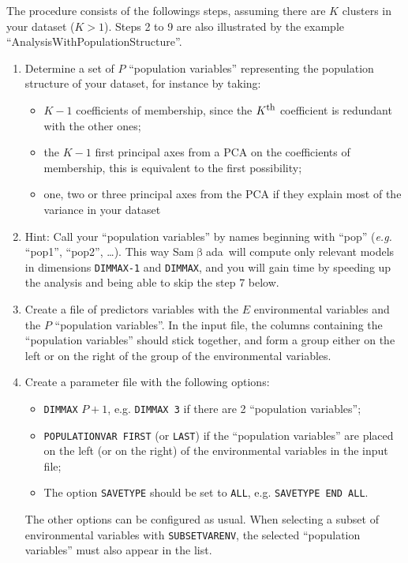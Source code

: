 \documentclass[a4paper,11pt]{article}
\newcommand{\smb}{\textsf{Sam$\upbeta$ada}}
\begin{document}
The procedure consists of the followings steps, assuming there are $K$ clusters in your dataset ($K>1$).
Steps 2 to 9 are also illustrated by the example \enquote{AnalysisWithPopulationStructure}.
\begin{enumerate}
\item{Determine a set of $P$ \enquote{population variables} representing the population structure of your dataset, for instance by taking:
\begin{itemize}
\item{$K-1$ coefficients of membership, since the $K^{\mbox{\footnotesize th}}$ coefficient is redundant with the other ones;}
\item{the $K-1$ first principal axes from a PCA on the coefficients of membership, this is equivalent to the first possibility;}
\item{one, two or three principal axes from the PCA if they explain most of the variance in your dataset}
\end{itemize}}
\item{\label{walkthough-step-naming-pop-variables}
Hint: Call your \enquote{population variables} by names beginning with \enquote{pop} (\emph{e.g.} \enquote{pop1}, \enquote{pop2}, \dots).
This way \smb\ will compute only relevant models in dimensions \texttt{DIMMAX-1} and \texttt{DIMMAX}, and you will gain time by speeding up the analysis and being able to skip the step 7 below.
}
\item{Create a file of predictors variables with the $E$ environmental variables and the $P$ \enquote{population variables}.
In the input file, the columns containing the \enquote{population variables} should stick together, and form a group either on the left or on the right of the group of the environmental variables.}
\item{Create a parameter file with the following options:
\begin{itemize}
\item{\texttt{DIMMAX} $P+1$, e.g. \texttt{DIMMAX 3} if there are 2 \enquote{population variables};}
\item{\texttt{POPULATIONVAR FIRST} (or \texttt{LAST}) if the \enquote{population variables} are placed on the left (or on the right) of the environmental variables in the input file;}
\item{The option \texttt{SAVETYPE} should be set to \texttt{ALL}, e.g. \texttt{SAVETYPE END ALL}.}
\end{itemize}
The other options can be configured as usual.
When selecting a subset of environmental variables with \texttt{SUBSETVARENV}, the selected \enquote{population variables} must also appear in the list.
}
\end{enumerate}
\end{document}
